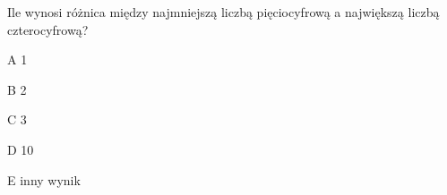 \begin{tresc}
Ile wynosi różnica między najmniejszą liczbą pięciocyfrową a największą liczbą czterocyfrową?
\end{tresc}
\begin{wariant}{A} 1 \end{wariant}
\begin{wariant}{B} 2 \end{wariant}
\begin{wariant}{C} 3 \end{wariant}
\begin{wariant}{D} 10 \end{wariant}
\begin{wariant}{E} inny wynik \end{wariant}
